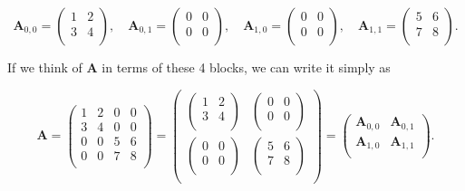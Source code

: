 \documentclass[
  letterpaper,
  DIV=11,
  numbers=noendperiod]{scrreprt}
\begin{document}
\[
\mathbf{A}_{0,0} = 
\begin{pmatrix}
1 & 2 \\
3 & 4 \\
\end{pmatrix}, \quad
\mathbf{A}_{0,1} = 
\begin{pmatrix}
0 & 0 \\
0 & 0 \\
\end{pmatrix}, \quad
\mathbf{A}_{1,0} = 
\begin{pmatrix}
0 & 0 \\
0 & 0 \\
\end{pmatrix}, \quad
\mathbf{A}_{1,1} = 
\begin{pmatrix}
5 & 6 \\
7 & 8 \\
\end{pmatrix}.
\]

If we think of \(\mathbf{A}\) in terms of these 4 blocks, we can write
it simply as

\[
\mathbf{A} = 
\begin{pmatrix}
1 & 2 & 0 & 0 \\
3 & 4 & 0 & 0 \\
0 & 0 & 5 & 6 \\
0 & 0 & 7 & 8 \\
\end{pmatrix} = 
\begin{pmatrix}
\begin{pmatrix} 1 & 2 \\ 3 & 4 \\ \end{pmatrix} & \begin{pmatrix} 0 & 0 \\ 0 & 0 \\ \end{pmatrix} \\
\begin{pmatrix} 0 & 0 \\ 0 & 0 \\ \end{pmatrix} & \begin{pmatrix} 5 & 6 \\ 7 & 8 \\ \end{pmatrix} \\
\end{pmatrix} = 
\begin{pmatrix}
\mathbf{A}_{0,0} & \mathbf{A}_{0,1} \\
\mathbf{A}_{1,0} & \mathbf{A}_{1,1} \\
\end{pmatrix}.
\]
\end{document}
